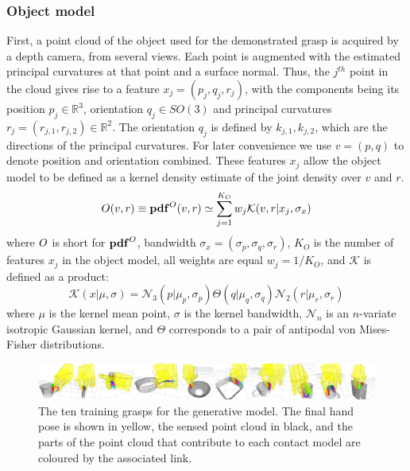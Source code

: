 \subsubsection{Object model}
First, a point cloud of the object used for the demonstrated grasp is acquired by a depth camera, from several views. Each point is augmented with the estimated principal curvatures at that point and a surface normal. Thus, the $j^{th}$ point  in the cloud gives rise to a feature $x_j=(p_j, q_j, r_j)$, with the components being its position $p_j \in \mathbb R^3$, orientation $q_j \in SO(3)$ and principal curvatures $r_j=(r_{j,1},r_{j,2}) \in \mathbb R^2$. The orientation $q_j$ is defined by $k_{j,1},k_{j,2}$, which are the directions of the principal curvatures.  For later convenience we use $v=(p,q)$ to denote position and orientation combined. These features $x_j$ allow the object model to be defined as a kernel density estimate of the joint density over $v$ and $r$.
\begin{equation}
\om(v, r) \equiv \pdf^\om(v, r) \simeq \sum_{j=1}^{K_O} w_j \mathcal{K}(v, r|{x_j}, \sigma_{x})
\label{eq:om}
\end{equation}
where $O$ is short for $\mathbf{pdf}^O$, bandwidth $\sigma_{x} = (\sigma_{p}, \sigma _{q}, \sigma_{r})$, $K_O$ is the number of features $x_j$ in the object model, all weights are equal $w_j = 1/{K_O}$, and $\mathcal{K}$ is defined as a product:
\begin{equation}\label{eq:kernel_in_se3}
\mathcal{K}(x | \mu, \sigma) = \mathcal{N}_3(p| \mu_p, \sigma_p) \Theta(q| \mu_q, \sigma_q) \mathcal{N}_2(r| \mu_r, \sigma_r)
\end{equation}
where $\mu$ is the kernel mean point, $\sigma$ is the kernel bandwidth, $\mathcal{N}_n$ is an $n$-variate isotropic Gaussian kernel, and ${\Theta}$ corresponds to a pair of antipodal von Mises-Fisher distributions.
\begin{figure}[t]
\includegraphics[width=\textwidth]{images/training-examples}
\caption{The ten training grasps for the generative model. The final hand pose is shown in yellow, the sensed point cloud in black, and the parts of the point cloud that contribute to each contact model are coloured by the associated link. \label{fig:generative-training}}
\end{figure}
